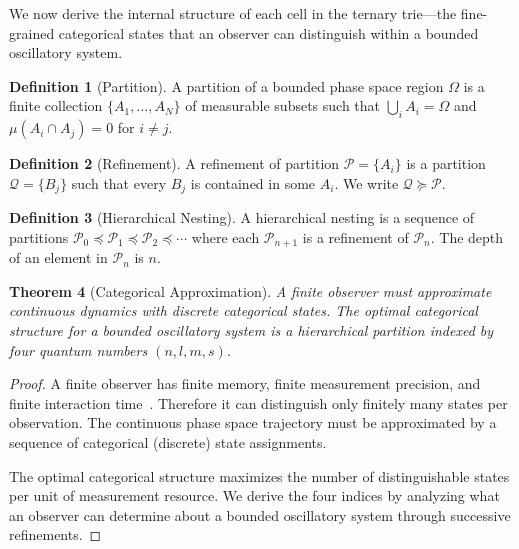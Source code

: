 \documentclass[11pt,twocolumn,a4paper]{article}
\newtheorem{theorem}{Theorem}[section]
\theoremstyle{definition}
\newtheorem{definition}[theorem]{Definition}
\theoremstyle{remark}
\begin{document}
We now derive the internal structure of each cell in the ternary trie---the fine-grained categorical states that an observer can distinguish within a bounded oscillatory system.

\begin{definition}[Partition]
\label{def:partition}
A partition of a bounded phase space region $\Omega$ is a finite collection $\{A_1, \ldots, A_N\}$ of measurable subsets such that $\bigcup_i A_i = \Omega$ and $\mu(A_i \cap A_j) = 0$ for $i \neq j$.
\end{definition}

\begin{definition}[Refinement]
\label{def:refinement}
A refinement of partition $\mathcal{P} = \{A_i\}$ is a partition $\mathcal{Q} = \{B_j\}$ such that every $B_j$ is contained in some $A_i$. We write $\mathcal{Q} \succeq \mathcal{P}$.
\end{definition}

\begin{definition}[Hierarchical Nesting]
\label{def:nesting}
A hierarchical nesting is a sequence of partitions $\mathcal{P}_0 \preceq \mathcal{P}_1 \preceq \mathcal{P}_2 \preceq \cdots$ where each $\mathcal{P}_{n+1}$ is a refinement of $\mathcal{P}_n$. The depth of an element in $\mathcal{P}_n$ is $n$.
\end{definition}

\begin{theorem}[Categorical Approximation]
\label{thm:categorical}
A finite observer must approximate continuous dynamics with discrete categorical states. The optimal categorical structure for a bounded oscillatory system is a hierarchical partition indexed by four quantum numbers $(n, l, m, s)$.
\end{theorem}

\begin{proof}
A finite observer has finite memory, finite measurement precision, and finite interaction time~\citep{landauer1961}. Therefore it can distinguish only finitely many states per observation. The continuous phase space trajectory must be approximated by a sequence of categorical (discrete) state assignments.

The optimal categorical structure maximizes the number of distinguishable states per unit of measurement resource. We derive the four indices by analyzing what an observer can determine about a bounded oscillatory system through successive refinements.
\end{proof}
\end{document}
